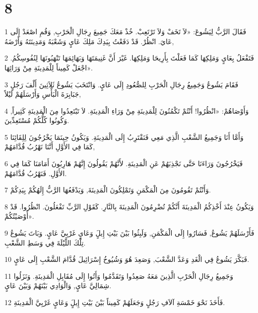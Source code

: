 \chapter{8}

\par 1 فَقَالَ الرَّبُّ لِيَشُوعَ: «لاَ تَخَفْ وَلاَ تَرْتَعِبْ. خُذْ مَعَكَ جَمِيعَ رِجَالِ الْحَرْبِ, وَقُمِ اصْعَدْ إِلَى عَايَ. انْظُرْ. قَدْ دَفَعْتُ بِيَدِكَ مَلِكَ عَايٍ وَشَعْبَهُ وَمَدِينَتَهُ وَأَرْضَهُ,
\par 2 فَتَفْعَلُ بِعَايٍ وَمَلِكِهَا كَمَا فَعَلْتَ بِأَرِيحَا وَمَلِكِهَا. غَيْرَ أَنَّ غَنِيمَتَهَا وَبَهَائِمَهَا تَنْهَبُونَهَا لِنُفُوسِكُمُ. اجْعَلْ كَمِيناً لِلْمَدِينَةِ مِنْ وَرَائِهَا».
\par 3 فَقَامَ يَشُوعُ وَجَمِيعُ رِجَالِ الْحَرْبِ لِلصُّعُودِ إِلَى عَايٍ. وَانْتَخَبَ يَشُوعُ ثَلاَثِينَ أَلْفَ رَجُلٍ جَبَابِرَةَ الْبَأْسِ وَأَرْسَلَهُمْ لَيْلاً,
\par 4 وَأَوْصَاهُمْ: «انْظُرُوا! أَنْتُمْ تَكْمُنُونَ لِلْمَدِينَةِ مِنْ وَرَاءِ الْمَدِينَةِ. لاَ تَبْتَعِدُوا مِنَ الْمَدِينَةِ كَثِيراً, وَكُونُوا كُلُّكُمْ مُسْتَعِدِّينَ.
\par 5 وَأَمَّا أَنَا وَجَمِيعُ الشَّعْبِ الَّذِي مَعِي فَنَقْتَرِبُ إِلَى الْمَدِينَةِ. وَيَكُونُ حِينَمَا يَخْرُجُونَ لِلِقَائِنَا كَمَا فِي الأَوَّلِ أَنَّنَا نَهْرُبُ قُدَّامَهُمْ,
\par 6 فَيَخْرُجُونَ وَرَاءَنَا حَتَّى نَجْذِبَهُمْ عَنِ الْمَدِينَةِ. لأَنَّهُمْ يَقُولُونَ إِنَّهُمْ هَارِبُونَ أَمَامَنَا كَمَا فِي الأَوَّلِ. فَنَهْرُبُ قُدَّامَهُمْ.
\par 7 وَأَنْتُمْ تَقُومُونَ مِنَ الْمَكْمَنِ وَتَمْلِكُونَ الْمَدِينَةَ, وَيَدْفَعُهَا الرَّبُّ إِلَهُكُمْ بِيَدِكُمْ.
\par 8 وَيَكُونُ عِنْدَ أَخْذِكُمُ الْمَدِينَةَ أَنَّكُمْ تُضْرِمُونَ الْمَدِينَةَ بِالنَّارِ. كَقَوْلِ الرَّبِّ تَفْعَلُونَ. انْظُرُوا. قَدْ أَوْصَيْتُكُمْ».
\par 9 فَأَرْسَلَهُمْ يَشُوعُ, فَسَارُوا إِلَى الْمَكْمَنِ, وَلَبِثُوا بَيْنَ بَيْتِ إِيلٍَ وَعَايٍ غَرْبِيَّ عَايٍ. وَبَاتَ يَشُوعُ تِلْكَ اللَّيْلَةَ فِي وَسَطِ الشَّعْبِ.
\par 10 فَبَكَّرَ يَشُوعُ فِي الْغَدِ وَعَدَّ الشَّعْبَ, وَصَعِدَ هُوَ وَشُيُوخُ إِسْرَائِيلَ قُدَّامَ الشَّعْبِ إِلَى عَايٍ.
\par 11 وَجَمِيعُ رِجَالِ الْحَرْبِ الَّذِينَ مَعَهُ صَعِدُوا وَتَقَدَّمُوا وَأَتُوا إِلَى مُقَابِلِ الْمَدِينَةِ. وَنَزَلُوا شِمَالِيَّ عَايٍ, وَالْوَادِي بَيْنَهُمْ وَبَيْنَ عَايٍ.
\par 12 فَأَخَذَ نَحْوَ خَمْسَةِ آلاَفِ رَجُلٍ وَجَعَلَهُمْ كَمِيناً بَيْنَ بَيْتِ إِيلٍَ وَعَايٍ غَرْبِيَّ الْمَدِينَةِ.
